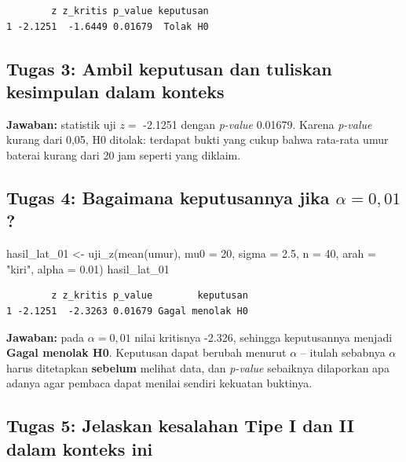 \documentclass[
  indonesian,
  letterpaper,
]{book}
\newenvironment{Shaded}{\begin{snugshade}}{\end{snugshade}}
\newcommand{\AttributeTok}[1]{\textcolor[rgb]{0.40,0.45,0.13}{#1}}
\newcommand{\DecValTok}[1]{\textcolor[rgb]{0.68,0.00,0.00}{#1}}
\newcommand{\FloatTok}[1]{\textcolor[rgb]{0.68,0.00,0.00}{#1}}
\newcommand{\FunctionTok}[1]{\textcolor[rgb]{0.28,0.35,0.67}{#1}}
\newcommand{\NormalTok}[1]{\textcolor[rgb]{0.00,0.23,0.31}{#1}}
\newcommand{\OtherTok}[1]{\textcolor[rgb]{0.00,0.23,0.31}{#1}}
\newcommand{\StringTok}[1]{\textcolor[rgb]{0.13,0.47,0.30}{#1}}
\begin{document}
\begin{verbatim}
        z z_kritis p_value keputusan
1 -2.1251  -1.6449 0.01679  Tolak H0
\end{verbatim}

\subsection{Tugas 3: Ambil keputusan dan tuliskan kesimpulan dalam
konteks}\label{tugas-3-ambil-keputusan-dan-tuliskan-kesimpulan-dalam-konteks}

\textbf{Jawaban:} statistik uji \(z =\) -2.1251 dengan \emph{p-value}
0.01679. Karena \emph{p-value} kurang dari 0,05, H0 ditolak: terdapat
bukti yang cukup bahwa rata-rata umur baterai kurang dari 20 jam seperti
yang diklaim.

\subsection{\texorpdfstring{Tugas 4: Bagaimana keputusannya jika
\(\alpha = 0{,}01\)?}{Tugas 4: Bagaimana keputusannya jika \textbackslash alpha = 0\{,\}01?}}\label{tugas-4-bagaimana-keputusannya-jika-alpha-001}

\begin{Shaded}
\begin{Highlighting}[]
\NormalTok{hasil\_lat\_01 }\OtherTok{\textless{}{-}} \FunctionTok{uji\_z}\NormalTok{(}\FunctionTok{mean}\NormalTok{(umur), }\AttributeTok{mu0 =} \DecValTok{20}\NormalTok{, }\AttributeTok{sigma =} \FloatTok{2.5}\NormalTok{, }\AttributeTok{n =} \DecValTok{40}\NormalTok{, }\AttributeTok{arah =} \StringTok{"kiri"}\NormalTok{,}
                      \AttributeTok{alpha =} \FloatTok{0.01}\NormalTok{)}
\NormalTok{hasil\_lat\_01}
\end{Highlighting}
\end{Shaded}

\begin{verbatim}
        z z_kritis p_value        keputusan
1 -2.1251  -2.3263 0.01679 Gagal menolak H0
\end{verbatim}

\textbf{Jawaban:} pada \(\alpha = 0{,}01\) nilai kritisnya -2.326,
sehingga keputusannya menjadi \textbf{Gagal menolak H0}. Keputusan dapat
berubah menurut \(\alpha\) -- itulah sebabnya \(\alpha\) harus
ditetapkan \textbf{sebelum} melihat data, dan \emph{p-value} sebaiknya
dilaporkan apa adanya agar pembaca dapat menilai sendiri kekuatan
buktinya.

\subsection{Tugas 5: Jelaskan kesalahan Tipe I dan II dalam konteks
ini}\label{tugas-5-jelaskan-kesalahan-tipe-i-dan-ii-dalam-konteks-ini}
\end{document}
